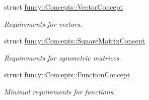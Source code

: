 \begin{DoxyCompactItemize}
struct \hyperlink{structfuncy_1_1Concepts_1_1VectorConcept}{funcy\-::\-Concepts\-::\-Vector\-Concept}
\begin{DoxyCompactList}\small\item\em Requirements for vectors. \end{DoxyCompactList}\item 
struct \hyperlink{structfuncy_1_1Concepts_1_1SquareMatrixConcept}{funcy\-::\-Concepts\-::\-Square\-Matrix\-Concept}
\begin{DoxyCompactList}\small\item\em Requirements for symmetric matrices. \end{DoxyCompactList}\item 
struct \hyperlink{structfuncy_1_1Concepts_1_1FunctionConcept}{funcy\-::\-Concepts\-::\-Function\-Concept}
\begin{DoxyCompactList}\small\item\em Minimal requirements for functions. \end{DoxyCompactList}\end{DoxyCompactItemize}
